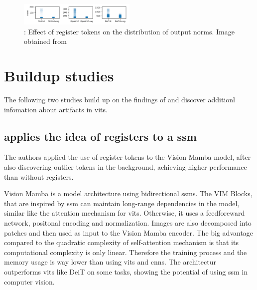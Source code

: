 \documentclass[conference]{IEEEtran}
\begin{document}
  \begin{figure}
    \centering
    \includegraphics[width=0.5\textwidth]{figures/register-norm-result.png}
    \caption{: Effect of register tokens on the distribution of output norms. Image obtained from \cite{registers}}
    \label{fig:register-norm-result}
  \end{figure}


  \section{Buildup studies}
  \label{sec:buildup}
  
  The following two studies build up on the findings of \cite{registers} and discover additionl infomation about artifacts in \acp{vit}.

  \subsection{\cite{mamba-needs-registers} applies the idea of registers to a \ac{ssm}}
  \label{sec:buildup:mamba}

  The authors applied the use of register tokens to the Vision Mamba model, after also discovering outlier tokens in the background, achieving higher performance than without registers. 
  
  Vision Mamba \cite{vision-mamba} is a model architecture using bidirectional \acfp{ssm}. The VIM Blocks, that are inspired by \ac{ssm} can maintain long-range dependencies in the model, similar like the attention mechanism for \acp{vit}. Otherwise, it uses a feedforeward network, positonal encoding and normalization. Images are also decomposed into patches and then used as input to the Vision Mamba encoder. The big advantage compared to the quadratic complexity of self-attention mechanism is that its computational complexity is only linear. Therefore the training process and the memory usage is way lower than using \acp{vit} and \acp{cnn}. The architectur outperforms \acp{vit} like DeiT \cite{deit} on some tasks, showing the potential of using \ac{ssm} in computer vision. \cite{vision-mamba} \cite{mamba-needs-registers}
  
\end{document}
